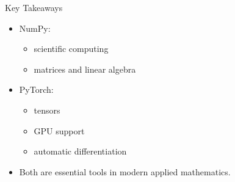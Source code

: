 \documentclass[aspectratio=169]{beamer}
\begin{document}
\begin{frame}{Key Takeaways}

\begin{itemize}
    \item NumPy:
    \begin{itemize}
        \item scientific computing
        \item matrices and linear algebra
    \end{itemize}

    \pause

    \item PyTorch:
    \begin{itemize}
        \item tensors
        \item GPU support
        \item automatic differentiation
    \end{itemize}

    \pause

    \item Both are essential tools in modern applied mathematics.
\end{itemize}

\end{frame}
\end{document}

